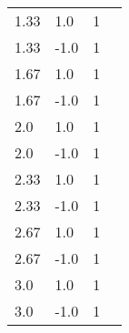 \begin{table}[H]
\begin{minipage}[t]{.45\linewidth}
\begin{tabular}{@{}llll@{}}
1.33   &  1.0     & 1        \\
1.33   & -1.0     & 1        \\
1.67   &  1.0     & 1        \\
1.67   & -1.0     & 1        \\
2.0    &  1.0     & 1        \\
2.0    & -1.0     & 1        \\
2.33   &  1.0     & 1        \\
2.33   & -1.0     & 1        \\
2.67   &  1.0     & 1        \\
2.67   & -1.0     & 1        \\
3.0    &  1.0     & 1        \\
3.0    & -1.0     & 1        \\ \bottomrule
\end{tabular}
\end{minipage}
\end{table}


